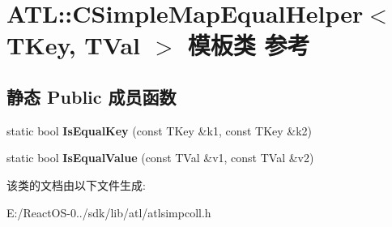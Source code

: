 \hypertarget{class_a_t_l_1_1_c_simple_map_equal_helper}{}\section{A\+TL\+:\+:C\+Simple\+Map\+Equal\+Helper$<$ T\+Key, T\+Val $>$ 模板类 参考}
\label{class_a_t_l_1_1_c_simple_map_equal_helper}
\subsection*{静态 Public 成员函数}
\begin{DoxyCompactItemize}
\item 
\mbox{\label{class_a_t_l_1_1_c_simple_map_equal_helper_aa24e8a8d9f3f95bb8a837b344734e39f}} 
static bool {\bfseries Is\+Equal\+Key} (const T\+Key \&k1, const T\+Key \&k2)
\item 
\mbox{\label{class_a_t_l_1_1_c_simple_map_equal_helper_abebf9a3464aeae0c67ec7e753a44377d}} 
static bool {\bfseries Is\+Equal\+Value} (const T\+Val \&v1, const T\+Val \&v2)
\end{DoxyCompactItemize}


该类的文档由以下文件生成\+:\begin{DoxyCompactItemize}
\item 
E\+:/\+React\+O\+S-\/0../sdk/lib/atl/atlsimpcoll.\+h\end{DoxyCompactItemize}
